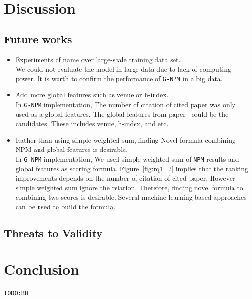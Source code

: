 \documentclass{llncs}
\newcommand{\name}{\texttt{G-NPM}\xspace}
\newcommand{\npm}{\texttt{NPM}\xspace}
\newcommand{\todo}[1]{\texttt{\color{red}TODO:#1}}
\begin{document}
\section{Discussion}


\subsection{Future works}

\begin{itemize}

\item Experiments of name over large-scale training data set.\\
We could not evaluate the model in large data due to lack of computing power.
It is worth to confirm the performance of \name in a big data.\\

\item Add more global features such as venue or h-index.\\
In \name implementation, The number of citation of cited paper was only used as a global features. The global features from paper~\cite{Bethard:2010:ICL:1871437.1871517} could be the candidates. These includes venue, h-index, and etc.\\

\item Rather than using simple weighted sum, finding Novel formula combining NPM and global features is desirable.\\
In \name implementation, We used simple weighted sum of \npm results and global features as scoring formula. Figure~\ref{fig:rq1_2} implies that the ranking improvements depends on the number of citation of cited paper. However simple weighted sum ignore the relation. Therefore, finding novel formula to combining two scores is desirable. Several machine-learning based approaches can be used to build the formula.

\end{itemize}

\subsection{Threats to Validity}


\section{Conclusion}
\label{sec:Conclusion}
\todo{BH}




\end{document}
